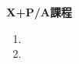\documentclass[a4 paper, 12pt]{report}
\begin{document}
\begin{center}
    \large \textbf{X+P/A課程}
\end{center}
    
\begin{enumerate}
    
    \item 
    
    \item 
    
\end{enumerate}
\end{document}
